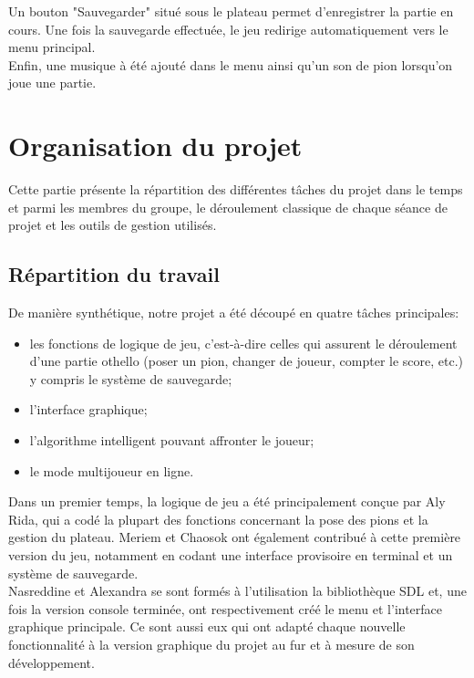 \documentclass[12pt, a4paper, oneside]{article}
\begin{document}
        Un bouton "Sauvegarder" situé sous le plateau permet d'enregistrer la partie en cours. Une fois la sauvegarde effectuée, 
        le jeu redirige automatiquement vers le menu principal.\\

        Enfin, une musique à été ajouté dans le menu ainsi qu'un son de pion lorsqu'on joue une partie. 

\section{Organisation du projet}
    Cette partie présente la répartition des différentes tâches du projet dans le temps et parmi les membres du groupe, le déroulement
    classique de chaque séance de projet et les outils de gestion utilisés.
    
    \subsection{Répartition du travail}
    De manière synthétique, notre projet a été découpé en quatre tâches principales: \\
	\begin{itemize}
	    \item les fonctions de logique de jeu, c'est-à-dire celles qui assurent le déroulement d'une partie othello (poser un pion, changer de
    joueur, compter le score, etc.) y compris le système de sauvegarde;
	    \item l'interface graphique; 
	    \item l'algorithme intelligent pouvant affronter le joueur; 
            \item le mode multijoueur en ligne. 
	\end{itemize}
 
Dans un premier temps, la logique de jeu a été principalement conçue par Aly Rida, qui a codé la plupart des fonctions concernant la
pose des pions et la gestion du plateau. Meriem et Chaosok ont également contribué à cette première version du jeu, notamment en codant
une interface provisoire en terminal et un système de sauvegarde. \\

Nasreddine et Alexandra se sont formés à l'utilisation la bibliothèque SDL et, une fois la version console terminée, ont respectivement
créé le menu et l'interface graphique principale. Ce sont aussi eux qui ont adapté chaque nouvelle fonctionnalité à la version graphique
du projet au fur et à mesure de son développement. \\
\end{document}
